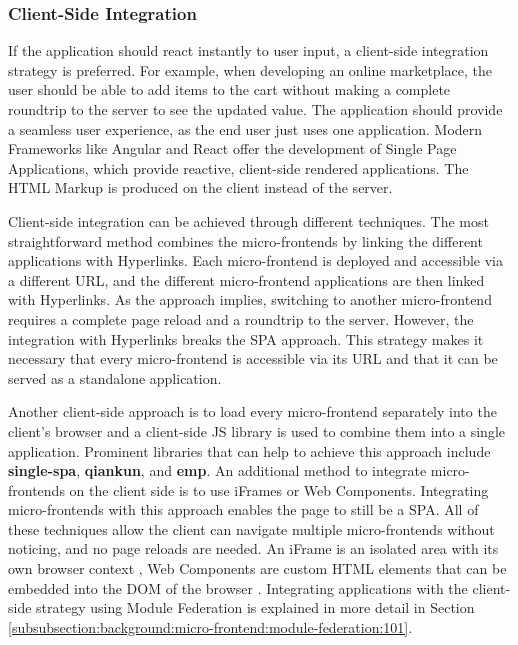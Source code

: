 \subsubsection{Client-Side Integration}\label{subsubsection:background:micro-frontend-architecture:integration-strategies:client-side-integration}

If the application should react instantly to user input, a client-side integration strategy is preferred. For example, when developing an online marketplace, the user should be able to add items to the cart without making a complete roundtrip to the server to see the updated value. The application should provide a seamless user experience, as the end user just uses one application. Modern Frameworks like Angular and React offer the development of Single Page Applications, which provide reactive, client-side rendered applications. The \ac{HTML} Markup is produced on the client instead of the server. \cite{book:2020:geers:background:micro-frontends:micro-frontends-in-action}

\bigskip

\noindent Client-side integration can be achieved through different techniques. The most straightforward method combines the micro-frontends by linking the different applications with Hyperlinks. Each micro-frontend is deployed and accessible via a different \ac{URL}, and the different micro-frontend applications are then linked with Hyperlinks. As the approach implies, switching to another micro-frontend requires a complete page reload and a roundtrip to the server. However, the integration with Hyperlinks breaks the \ac{SPA} approach. This strategy makes it necessary that every micro-frontend is accessible via its \ac{URL} and that it can be served as a standalone application.

\bigskip

\noindent Another client-side approach is to load every micro-frontend separately into the client's browser and a client-side \ac{JS} library is used to combine them into a single application. Prominent libraries that can help to achieve this approach include \textbf{single-spa}, \textbf{qiankun}, and \textbf{emp}. An additional method to integrate micro-frontends on the client side is to use iFrames or Web Components. Integrating micro-frontends with this approach enables the page to still be a \ac{SPA}. All of these techniques allow the client can navigate multiple micro-frontends without noticing, and no page reloads are needed. An iFrame is an isolated area with its own browser context \cite[35]{book:2020:geers:background:micro-frontends:micro-frontends-in-action}, Web Components are custom \ac{HTML} elements that can be embedded into the \ac{DOM} of the browser \cite[103]{book:2019:farrell:background:micro-frontends:web-components-in-action}. Integrating applications with the client-side strategy using Module Federation is explained in more detail in Section \ref{subsubsection:background:micro-frontend:module-federation:101}.

